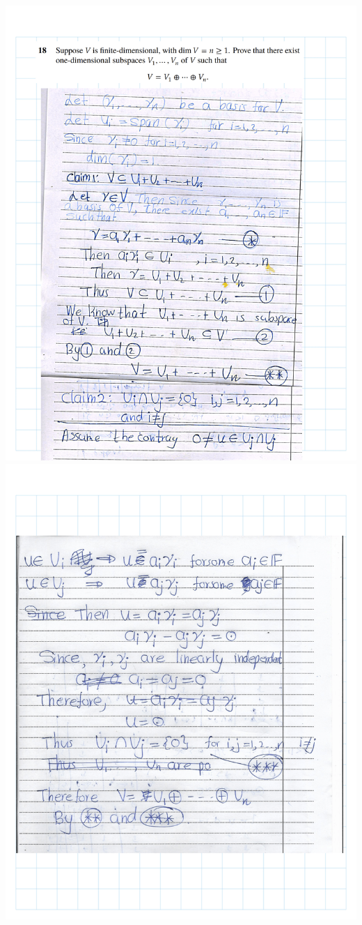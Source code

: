 \documentclass[
]{book}
\theoremstyle{definition}
\theoremstyle{definition}
\theoremstyle{definition}
\theoremstyle{definition}
\theoremstyle{remark}
\begin{document}
\includegraphics{fig/Ex 2B and 2C/Ex 2c (50).png}
\includegraphics{fig/Ex 2B and 2C/Ex 2c (51).png}
\end{document}
